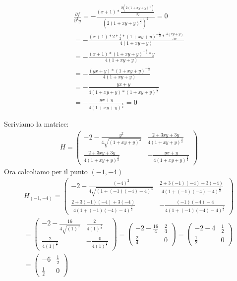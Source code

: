 \documentclass{article}
\begin{document}
\begin{align*}
    \frac{\partial f}{\partial^2 y}=-\frac{(x+1)* \frac{\partial (2(1+xy+y)^{\frac{1}{2}})}{\partial y}}{(2(1+xy+y)^{\frac{1}{2}})^2} =0\\
    =-\frac{(x+1)* 2*\frac{1}{2}*(1+xy+y)^{-\frac{1}{2}}*\frac{\partial (xy+y)}{\partial x}}{4(1+xy+y)} \\
    =-\frac{(x+1)*(1+xy+y)^{-\frac{1}{2}} * y}{4(1+xy+y)} \\
    =-\frac{(yx+y)*(1+xy+y)^{-\frac{1}{2}}}{4(1+xy+y)} \\
    =-\frac{yx+y}{4(1+xy+y)*(1+xy+y)^{\frac{1}{2}}} \\
    =-\frac{yx+y}{4(1+xy+y)^{\frac{3}{2}}}=0
\end{align*}

Scriviamo la matrice:
\begin{align*}
    H = \begin{pmatrix}
        -2 - \frac{y^2}{4\sqrt{(1+xy+y)^3}} & \frac{2+3xy+3y}{4(1+xy+y)^{\frac{3}{2}}} \\
        \frac{2+3xy+3y}{4(1+xy+y)^{\frac{3}{2}}} & -\frac{yx+y}{4(1+xy+y)^{\frac{3}{2}}}
    \end{pmatrix}
\end{align*}
Ora calcoliamo per il punto $(-1,-4)$
\begin{align*}
    H_{(-1,-4)} = \begin{pmatrix}
        -2 - \frac{(-4)^2}{4\sqrt{(1+(-1)(-4)-4)^3}} & \frac{2+3(-1)(-4)+3(-4)}{4(1+(-1)(-4)-4)^{\frac{3}{2}}} \\
        \frac{2+3(-1)(-4)+3(-4)}{4(1+(-1)(-4)-4)^{\frac{3}{2}}} & -\frac{(-1)(-4)-4}{4(1+(-1)(-4)-4)^{\frac{3}{2}}}
    \end{pmatrix} \\
    =\begin{pmatrix}
        -2 - \frac{16}{4\sqrt{(1)^3}} & \frac{2}{4(1)^{\frac{3}{2}}} \\
        \frac{2}{4(1)^{\frac{3}{2}}} & -\frac{0}{4(1)^{\frac{3}{2}}}
    \end{pmatrix} 
    = \begin{pmatrix}
        -2 - \frac{16}{4} & \frac{2}{4} \\
        \frac{2}{4} & 0
    \end{pmatrix} 
    = \begin{pmatrix}
        -2 - 4 & \frac{1}{2} \\
        \frac{1}{2} & 0
    \end{pmatrix} \\
    = \begin{pmatrix}
        -6 & \frac{1}{2} \\
        \frac{1}{2} & 0
    \end{pmatrix}
\end{align*}
\end{document}
